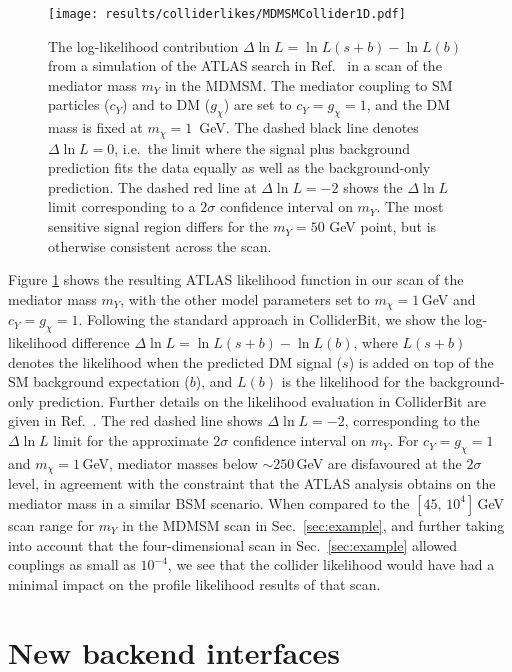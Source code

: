 \documentclass[pdftex,twocolumn,epjc3_preprint,runningheads]{svjour3}
\renewcommand{\_}{\discretionary{\underscore}{}{\underscore}}
\newcommand{\colliderbit}{\textsf{ColliderBit}\xspace}
\begin{document}
\begin{figure}[tbp]
    \vspace{-2mm}
    \centering
    \texttt{[image: results/collider\_likes/MDMSM\_Collider\_1D.pdf]}
    \caption{The log-likelihood contribution $\Delta \ln L = \ln L(s+b) - \ln L(b)$ from a simulation of the ATLAS search in Ref.\ \cite{2102.01444} in a scan of the mediator mass $m_Y$ in the MDMSM. The mediator coupling to SM particles ($c_Y$) and to DM ($g_{\chi}$) are set to $c_{Y} = g_{\chi} = 1$, and the DM mass is fixed at $m_{\chi} = 1$\, GeV. The dashed black line denotes $\Delta \ln L = 0$, i.e.\ the limit where the signal plus background prediction fits the data equally as well as the background-only prediction. The dashed red line at $\Delta \ln L = -2$ shows the $\Delta \ln L$ limit corresponding to a $2\sigma$ confidence interval on $m_Y$. The most sensitive signal region differs for the $m_Y = 50$ GeV point, but is otherwise consistent across the scan.}
    \label{fig:MDMSMCollider}
\end{figure}

Figure \ref{fig:MDMSMCollider} shows the resulting ATLAS likelihood function in our scan of the mediator mass $m_Y$, with the other model parameters set to $m_{\chi} = 1$\,GeV and $c_Y = g_{\chi} = 1$. Following the standard approach in \colliderbit, we show the log-likelihood difference $\Delta \ln L = \ln L(s+b) - \ln L(b)$, where $L(s+b)$ denotes the likelihood when the predicted DM signal ($s$) is added on top of the SM background expectation ($b$), and $L(b)$ is the likelihood for the background-only prediction. Further details on the likelihood evaluation in \colliderbit are given in Ref.\ \cite{ColliderBit}. The red dashed line shows $\Delta \ln L = -2$, corresponding to the $\Delta \ln L$ limit for the approximate $2\sigma$ confidence interval on $m_Y$. For $c_Y = g_{\chi} = 1$ and $m_{\chi} = 1$\,GeV, mediator masses below $\sim250$\,GeV are disfavoured at the $2\sigma$ level, in agreement with the constraint that the ATLAS analysis obtains on the mediator mass in a similar BSM scenario. When compared to the $[45,\, 10^4]$\,GeV scan range for $m_Y$ in the MDMSM scan in Sec.\ \ref{sec:example}, and further taking into account that the four-dimensional scan in Sec.\ \ref{sec:example} allowed couplings as small as $10^{-4}$, we see that the collider likelihood would have had a minimal impact on the profile likelihood results of that scan.


\section{New backend interfaces}
\end{document}
